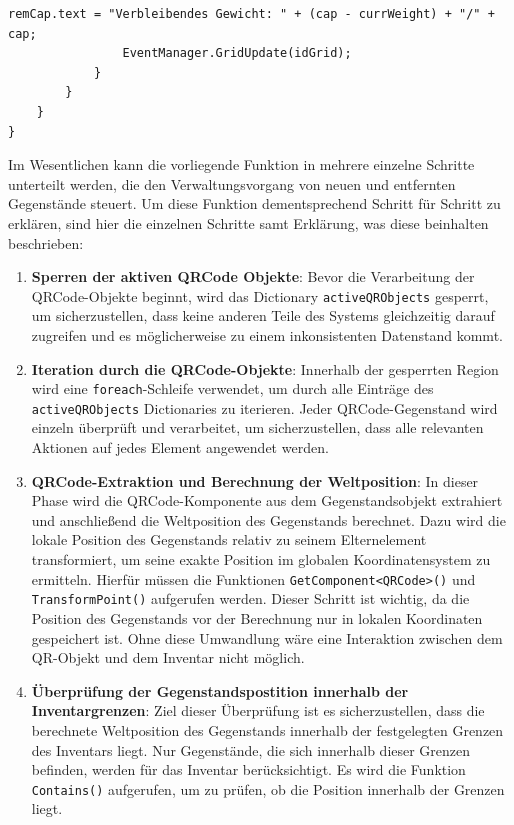 \begin{itemize}
\begin{lstlisting}[style=csharp, caption={Neue / Entfernte Items erkennen}, label=code:controller_updateGrid]
                remCap.text = "Verbleibendes Gewicht: " + (cap - currWeight) + "/" + cap;
                EventManager.GridUpdate(idGrid);
            }
        }
    }
}
\end{lstlisting}
Im Wesentlichen kann die vorliegende Funktion in mehrere einzelne Schritte unterteilt werden, die den Verwaltungsvorgang
von neuen und entfernten Gegenstände steuert. Um diese Funktion dementsprechend Schritt für Schritt zu erklären, sind
hier die einzelnen Schritte samt Erklärung, was diese beinhalten beschrieben:
\begin{enumerate}
    \item \textbf{Sperren der aktiven QRCode Objekte}:
    Bevor die Verarbeitung der QRCode-Objekte beginnt, wird das Dictionary \texttt{activeQRObjects} gesperrt, um
    sicherzustellen, dass keine anderen Teile des Systems gleichzeitig darauf zugreifen und es möglicherweise zu einem
    inkonsistenten Datenstand kommt.

    \item \textbf{Iteration durch die QRCode-Objekte}:
    Innerhalb der gesperrten Region wird eine \texttt{foreach}-Schleife verwendet, um durch alle Einträge des
    \texttt{activeQRObjects} Dictionaries zu iterieren. Jeder QRCode-Gegenstand wird einzeln überprüft und verarbeitet,
    um sicherzustellen, dass alle relevanten Aktionen auf jedes Element angewendet werden.

    \item \textbf{QRCode-Extraktion und Berechnung der Weltposition}:
    In dieser Phase wird die QRCode-Komponente aus dem Gegenstandsobjekt extrahiert und anschließend die Weltposition
    des Gegenstands berechnet. Dazu wird die lokale Position des Gegenstands relativ zu seinem Elternelement transformiert,
    um seine exakte Position im globalen Koordinatensystem zu ermitteln. Hierfür müssen die Funktionen
    \texttt{GetComponent<QRCode>()} und \texttt{TransformPoint()} aufgerufen werden. Dieser Schritt ist wichtig, da die
    Position des Gegenstands vor der Berechnung nur in lokalen Koordinaten gespeichert ist. Ohne diese Umwandlung wäre
    eine Interaktion zwischen dem QR-Objekt und dem Inventar nicht möglich.

    \item \textbf{Überprüfung der Gegenstandspostition innerhalb der Inventargrenzen}:
    Ziel dieser Überprüfung ist es sicherzustellen, dass die berechnete Weltposition des Gegenstands innerhalb der
    festgelegten Grenzen des Inventars liegt. Nur Gegenstände, die sich innerhalb dieser Grenzen befinden, werden für
    das Inventar berücksichtigt. Es wird die Funktion \texttt{Contains()} aufgerufen, um zu prüfen, ob die Position
    innerhalb der Grenzen liegt.


\end{enumerate}
\end{itemize}
